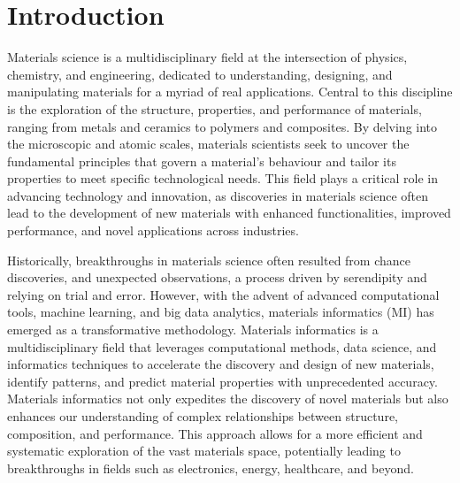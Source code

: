 \chapter{Introduction}



Materials science is a multidisciplinary field at the intersection of physics, chemistry, and engineering, dedicated to understanding, designing, and manipulating materials for a myriad of real applications. 
Central to this discipline is the exploration of the structure, properties, and performance of materials, ranging from metals and ceramics to polymers and composites. By delving into the microscopic and atomic scales, materials scientists seek to uncover the fundamental principles that govern a material's behaviour and tailor its properties to meet specific technological needs. 
This field plays a critical role in advancing technology and innovation, as discoveries in materials science often lead to the development of new materials with enhanced functionalities, improved performance, and novel applications across industries.

Historically, breakthroughs in materials science often resulted from chance discoveries, and unexpected observations, a process driven by serendipity and relying on trial and error. 
However, with the advent of advanced computational tools, machine learning, and big data analytics, materials informatics (MI) has emerged as a transformative methodology. 
Materials informatics is a multidisciplinary field that leverages computational methods, data science, and informatics techniques to accelerate the discovery and design of new materials, identify patterns, and predict material properties with unprecedented accuracy. 
Materials informatics not only expedites the discovery of novel materials but also enhances our understanding of complex relationships between structure, composition, and performance. 
This approach allows for a more efficient and systematic exploration of the vast materials space, potentially leading to breakthroughs in fields such as electronics, energy, healthcare, and beyond. 

